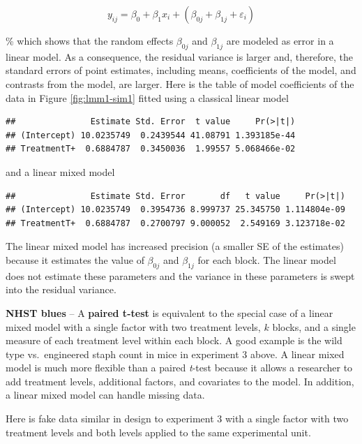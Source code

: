 \documentclass[]{book}
\begin{document}
\begin{equation}
y_{ij} = \beta_{0} + \beta_{1} x_i + (\beta_{0j} + \beta_{1j} + \varepsilon_i)
\label{eq:lmm-spec1b}
\end{equation}

\% which shows that the random effects \(\beta_{0j}\) and \(\beta_{1j}\)
are modeled as error in a linear model. As a consequence, the residual
variance is larger and, therefore, the standard errors of point
estimates, including means, coefficients of the model, and contrasts
from the model, are larger. Here is the table of model coefficients of
the data in Figure \ref{fig:lmm1-sim1} fitted using a classical linear
model

\begin{verbatim}
##               Estimate Std. Error  t value     Pr(>|t|)
## (Intercept) 10.0235749  0.2439544 41.08791 1.393185e-44
## TreatmentT+  0.6884787  0.3450036  1.99557 5.068466e-02
\end{verbatim}

and a linear mixed model

\begin{verbatim}
##               Estimate Std. Error       df   t value     Pr(>|t|)
## (Intercept) 10.0235749  0.3954736 8.999737 25.345750 1.114804e-09
## TreatmentT+  0.6884787  0.2700797 9.000052  2.549169 3.123718e-02
\end{verbatim}

The linear mixed model has increased precision (a smaller SE of the
estimates) because it estimates the value of \(\beta_{0j}\) and
\(\beta_{1j}\) for each block. The linear model does not estimate these
parameters and the variance in these parameters is swept into the
residual variance.

\textbf{NHST blues} -- A \textbf{paired t-test} is equivalent to the
special case of a linear mixed model with a single factor with two
treatment levels, \(k\) blocks, and a single measure of each treatment
level within each block. A good example is the wild type vs.~engineered
staph count in mice in experiment 3 above. A linear mixed model is much
more flexible than a paired \emph{t}-test because it allows a researcher
to add treatment levels, additional factors, and covariates to the
model. In addition, a linear mixed model can handle missing data.

Here is fake data similar in design to experiment 3 with a single factor
with two treatment levels and both levels applied to the same
experimental unit.
\end{document}
